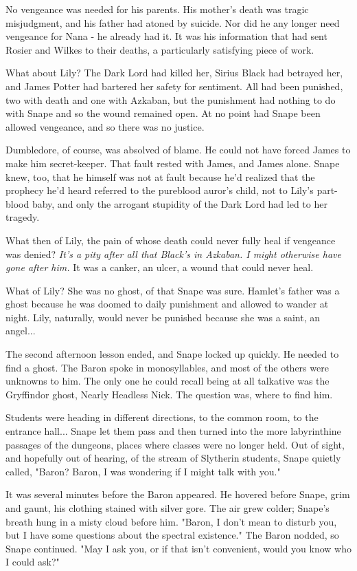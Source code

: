 No vengeance was needed for his parents. His mother's death was tragic misjudgment, and his father had atoned by suicide. Nor did he any longer need vengeance for Nana - he already had it. It was his information that had sent Rosier and Wilkes to their deaths, a particularly satisfying piece of work.

What about Lily? The Dark Lord had killed her, Sirius Black had betrayed her, and James Potter had bartered her safety for sentiment. All had been punished, two with death and one with Azkaban, but the punishment had nothing to do with Snape and so the wound remained open. At no point had Snape been allowed vengeance, and so there was no justice.

Dumbledore, of course, was absolved of blame. He could not have forced James to make him secret-keeper. That fault rested with James, and James alone. Snape knew, too, that he himself was not at fault because he'd realized that the prophecy he'd heard referred to the pureblood auror's child, not to Lily's part-blood baby, and only the arrogant stupidity of the Dark Lord had led to her tragedy.

What then of Lily, the pain of whose death could never fully heal if vengeance was denied? \emph{It's a pity after all that Black's in Azkaban. I might otherwise have gone after him.} It was a canker, an ulcer, a wound that could never heal.

What of Lily? She was no ghost, of that Snape was sure. Hamlet's father was a ghost because he was doomed to daily punishment and allowed to wander at night. Lily, naturally, would never be punished because she was a saint, an angel...

The second afternoon lesson ended, and Snape locked up quickly. He needed to find a ghost. The Baron spoke in monosyllables, and most of the others were unknowns to him. The only one he could recall being at all talkative was the Gryffindor ghost, Nearly Headless Nick. The question was, where to find him.

Students were heading in different directions, to the common room, to the entrance hall... Snape let them pass and then turned into the more labyrinthine passages of the dungeons, places where classes were no longer held. Out of sight, and hopefully out of hearing, of the stream of Slytherin students, Snape quietly called, "Baron? Baron, I was wondering if I might talk with you."

It was several minutes before the Baron appeared. He hovered before Snape, grim and gaunt, his clothing stained with silver gore. The air grew colder; Snape's breath hung in a misty cloud before him. "Baron, I don't mean to disturb you, but I have some questions about the spectral existence." The Baron nodded, so Snape continued. "May I ask you, or if that isn't convenient, would you know who I could ask?"

